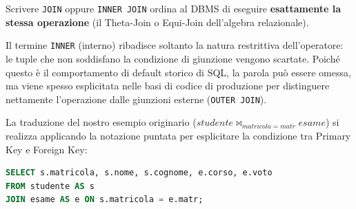 \begin{dettagli}
 Scrivere \texttt{JOIN} oppure \texttt{INNER JOIN} ordina al DBMS di eseguire \textbf{esattamente la stessa operazione} (il Theta-Join o Equi-Join dell'algebra relazionale).

Il termine \texttt{INNER} (interno) ribadisce soltanto la natura restrittiva dell'operatore: le tuple che non soddisfano la condizione di giunzione vengono scartate. Poiché questo è il comportamento di default storico di SQL, la parola può essere omessa, ma viene spesso esplicitata nelle basi di codice di produzione per distinguere nettamente l'operazione dalle giunzioni esterne (\texttt{OUTER JOIN}).
\end{dettagli}

La traduzione del nostro esempio originario ($studente \bowtie_{matricola = matr} esame$) si realizza applicando la notazione puntata per esplicitare la condizione tra Primary Key e Foreign Key:
\begin{lstlisting}[language=SQL, basicstyle=\ttfamily\small, keywordstyle=\color{blue}\bfseries]
SELECT s.matricola, s.nome, s.cognome, e.corso, e.voto
FROM studente AS s
JOIN esame AS e ON s.matricola = e.matr;
\end{lstlisting}

